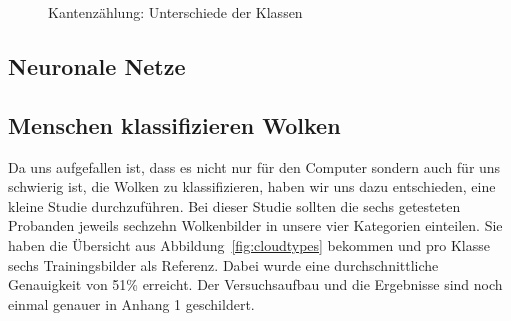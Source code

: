 \documentclass[a4,german]{article}
\begin{document}
\begin{figure}[h!]%
\caption{Kantenzählung: Unterschiede der Klassen}
    \label{fig:kbs}
\end{figure}

\subsection{Neuronale Netze}

\subsection{Menschen klassifizieren Wolken}

Da uns aufgefallen ist, dass es nicht nur für den Computer sondern auch für uns schwierig ist, die Wolken zu klassifizieren, haben wir uns dazu entschieden, eine kleine Studie durchzuführen.
Bei dieser Studie sollten die sechs getesteten Probanden jeweils sechzehn Wolkenbilder in unsere vier Kategorien einteilen.
Sie haben die Übersicht aus Abbildung~\ref{fig:cloudtypes} bekommen und pro Klasse sechs Trainingsbilder als Referenz.
Dabei wurde eine durchschnittliche Genauigkeit von 51\% erreicht. Der Versuchsaufbau und die Ergebnisse sind noch einmal genauer in Anhang 1 %
geschildert.
\end{document}
